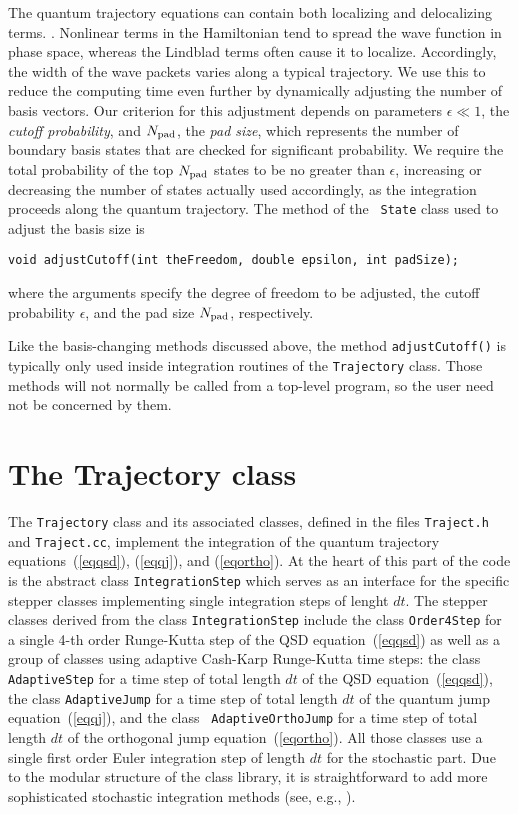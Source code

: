 The quantum trajectory equations can contain both localizing and delocalizing
terms. {\cite{Gisin1992c,Diosi1988c,%
Gisin1993b,Percival1994b,Steimle1995a,Holland1996a}}.
Nonlinear terms in the Hamiltonian tend to spread the wave function in
phase space, whereas the Lindblad terms often cause it to
localize. Accordingly, the width of the wave packets varies along a typical
trajectory. We use this to reduce the computing time even further by
dynamically adjusting the number of basis vectors. Our criterion for this
adjustment depends on parameters $\epsilon\ll1$, the {\it cutoff probability},
and $N_{\rm pad}$, the {\it pad size}, which represents the number of boundary
basis states that are checked for significant probability. We require the total
probability of the top $N_{\rm pad}$ states to be no greater than $\epsilon$,
increasing or decreasing the number of states actually used accordingly, as
the integration proceeds along the quantum trajectory.  The method of the {\tt
State} class used to adjust the basis size is
\begin{verbatim}
void adjustCutoff(int theFreedom, double epsilon, int padSize);
\end{verbatim}
where the arguments specify the degree of freedom to be adjusted, the cutoff
probability $\epsilon$, and the pad size $N_{\rm pad}$, respectively.

Like the basis-changing methods discussed above, the method {\tt adjustCutoff()}
is typically only used inside integration routines of the {\tt Trajectory}
class. Those methods will not normally be called from a top-level program,
so the user need not be concerned by them.

\section{The Trajectory class}   \label{sectraj}

The {\tt Trajectory} class and its associated classes, defined in the files
{\tt Traject.h} and {\tt Traject.cc}, implement the integration of the quantum
trajectory equations~(\ref{eqqsd}), (\ref{eqqj}), and (\ref{eqortho}). At the
heart of this part of the code is the abstract class {\tt IntegrationStep}
which serves as an interface for the specific stepper classes implementing
single integration steps of lenght $dt$. The stepper classes derived from the
class {\tt IntegrationStep} include the class {\tt Order4Step} for a single
4-th order Runge-Kutta step of the QSD equation~(\ref{eqqsd}) as well as a
group of classes using adaptive Cash-Karp Runge-Kutta time steps: the class
{\tt AdaptiveStep} for a time step of total length $dt$ of the QSD
equation~(\ref{eqqsd}), the class {\tt AdaptiveJump} for a time step of total
length $dt$ of the quantum jump equation~(\ref{eqqj}), and the class {\tt
AdaptiveOrthoJump} for a time step of total length $dt$ of the orthogonal jump
equation~(\ref{eqortho}). All those classes use a single first order Euler
integration step of length $dt$ for the stochastic part.
Due to the modular structure of the class library, it is straightforward to add 
more sophisticated stochastic integration methods (see, e.g., 
{\cite{Kloeden1992,Steinbach1995a}}). 

